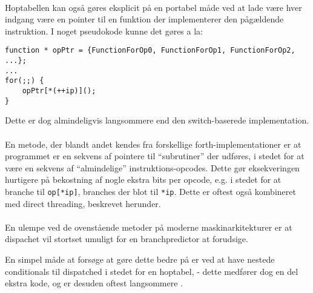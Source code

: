 \documentclass[12pt]{article}
\begin{document}
\paragraph{}
Hoptabellen kan også gøres eksplicit på en portabel måde ved at lade være hver indgang være en pointer til en funktion der implementerer den pågældende instruktion. I noget pseudokode kunne det gøres a la:
\begin{verbatim}
function * opPtr = {FunctionForOp0, FunctionForOp1, FunctionForOp2, ...};
...
for(;;) {
    opPtr[*(++ip)]();
}
\end{verbatim}
Dette er dog almindeligvis langsommere end den switch-baserede implementation.

\paragraph{}
En metode, der blandt andet kendes fra forskellige forth-implementationer er at programmet er en sekvens af pointere til ``subrutiner'' der udføres, i stedet for at være en sekvens af ``almindelige'' instruktions-opcodes. Dette gør eksekveringen hurtigere på bekostning af nogle ekstra bits per opcode, e.g. i stedet for at branche til \verb|op[*ip]|, branches der blot til \verb|*ip|. Dette er oftest også kombineret med direct threading, beskrevet herunder.

\paragraph{}
En ulempe ved de ovenstående metoder på moderne maskinarkitekturer er at dispachet vil stortset umuligt for en branchpredictor at forudsige.

En simpel måde at forsøge at gøre dette bedre på er ved at have nestede conditionals til dispatched i stedet for en hoptabel, - dette medfører dog en del ekstra kode, og er desuden oftest langsommere \cite{cond-dispatch}.
\end{document}
